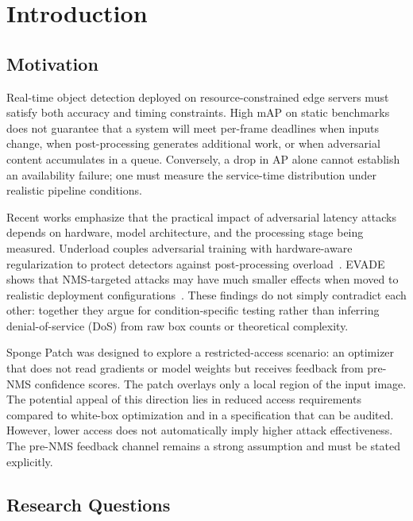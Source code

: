\documentclass[a4paper,fleqn]{cas-dc}
\begin{document}
\section{Introduction}

\subsection{Motivation}

Real-time object detection deployed on resource-constrained edge servers must satisfy both accuracy and timing constraints. High mAP on static benchmarks does not guarantee that a system will meet per-frame deadlines when inputs change, when post-processing generates additional work, or when adversarial content accumulates in a queue. Conversely, a drop in AP alone cannot establish an availability failure; one must measure the service-time distribution under realistic pipeline conditions.

Recent works emphasize that the practical impact of adversarial latency attacks depends on hardware, model architecture, and the processing stage being measured. Underload couples adversarial training with hardware-aware regularization to protect detectors against post-processing overload~\cite{underload2025}. EVADE shows that NMS-targeted attacks may have much smaller effects when moved to realistic deployment configurations~\cite{evade2025}. These findings do not simply contradict each other: together they argue for condition-specific testing rather than inferring denial-of-service (DoS) from raw box counts or theoretical complexity.

Sponge Patch was designed to explore a restricted-access scenario: an optimizer that does not read gradients or model weights but receives feedback from pre-NMS confidence scores. The patch overlays only a local region of the input image. The potential appeal of this direction lies in reduced access requirements compared to white-box optimization and in a specification that can be audited. However, lower access does not automatically imply higher attack effectiveness. The pre-NMS feedback channel remains a strong assumption and must be stated explicitly.

\subsection{Research Questions}
\end{document}

